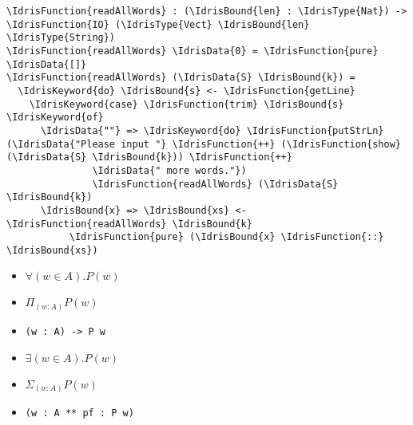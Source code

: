 \documentclass[xetex,xcolor={usenames,dvipsnames},mathserif,serif,17pt]{beamer}
\newcommand{\IdrisData}[1]{\textcolor{red}{#1}}
\newcommand{\IdrisType}[1]{\textcolor{blue}{#1}}
\newcommand{\IdrisBound}[1]{\textcolor{violet}{#1}}
\newcommand{\IdrisFunction}[1]{\textcolor{OliveGreen}{#1}}
\newcommand{\IdrisKeyword}[1]{{\underline{#1}}}
\begin{document}
\begin{frame}[fragile]
\begin{Verbatim}[commandchars=\\\{\}]
\IdrisFunction{readAllWords} : (\IdrisBound{len} : \IdrisType{Nat}) -> \IdrisFunction{IO} (\IdrisType{Vect} \IdrisBound{len} \IdrisType{String})
\IdrisFunction{readAllWords} \IdrisData{0} = \IdrisFunction{pure} \IdrisData{[]}
\IdrisFunction{readAllWords} (\IdrisData{S} \IdrisBound{k}) =
  \IdrisKeyword{do} \IdrisBound{s} <- \IdrisFunction{getLine}
    \IdrisKeyword{case} \IdrisFunction{trim} \IdrisBound{s} \IdrisKeyword{of}
      \IdrisData{""} => \IdrisKeyword{do} \IdrisFunction{putStrLn} (\IdrisData{"Please input "} \IdrisFunction{++} (\IdrisFunction{show} (\IdrisData{S} \IdrisBound{k})) \IdrisFunction{++}
               \IdrisData{" more words."})
               \IdrisFunction{readAllWords} (\IdrisData{S} \IdrisBound{k})
      \IdrisBound{x} => \IdrisBound{xs} <- \IdrisFunction{readAllWords} \IdrisBound{k}
           \IdrisFunction{pure} (\IdrisBound{x} \IdrisFunction{::} \IdrisBound{xs})
\end{Verbatim}
\end{frame}

\fontsize{24}{24}\selectfont

\begin{frame}
  \begin{itemize}
  \item $\forall (w \in A). P(w)$
  \item $\Pi_{(w:A)} P(w)$
  \item \lstinline{(w : A) -> P w}
  \end{itemize}
\end{frame}

\begin{frame}
  \begin{itemize}
  \item $\exists (w \in A). P(w)$
  \item $\Sigma_{(w:A)} P(w)$
  \item \lstinline{(w : A ** pf : P w)}
  \end{itemize}
\end{frame}
\end{document}
